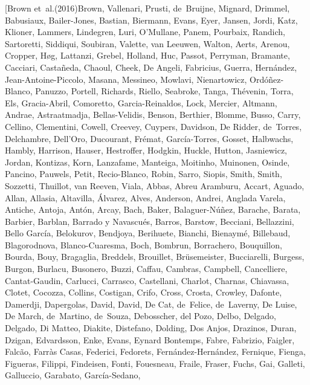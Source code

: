 \documentclass[apj, revtex4-1]{emulateapj}
\begin{document}
\begin{thebibliography}{}
\bibitem[{Brown {et~al.}(2016)Brown, Vallenari, Prusti, de~Bruijne, Mignard,
  Drimmel, Babusiaux, Bailer-Jones, Bastian, Biermann, Evans, Eyer, Jansen,
  Jordi, Katz, Klioner, Lammers, Lindegren, Luri, O'Mullane, Panem, Pourbaix,
  Randich, Sartoretti, Siddiqui, Soubiran, Valette, van Leeuwen, Walton, Aerts,
  Arenou, Cropper, H{\o}g, Lattanzi, Grebel, Holland, Huc, Passot, Perryman,
  Bramante, Cacciari, Casta{\~{n}}eda, Chaoul, Cheek, {De Angeli}, Fabricius,
  Guerra, Hern{\'{a}}ndez, Jean-Antoine-Piccolo, Masana, Messineo, Mowlavi,
  Nienartowicz, Ord{\'{o}}{\~{n}}ez-Blanco, Panuzzo, Portell, Richards, Riello,
  Seabroke, Tanga, Th{\'{e}}venin, Torra, Els, Gracia-Abril, Comoretto,
  Garcia-Reinaldos, Lock, Mercier, Altmann, Andrae, Astraatmadja,
  Bellas-Velidis, Benson, Berthier, Blomme, Busso, Carry, Cellino, Clementini,
  Cowell, Creevey, Cuypers, Davidson, {De Ridder}, de~Torres, Delchambre,
  Dell'Oro, Ducourant, Fr{\'{e}}mat, Garc{\'{i}}a-Torres, Gosset, Halbwachs,
  Hambly, Harrison, Hauser, Hestroffer, Hodgkin, Huckle, Hutton, Jasniewicz,
  Jordan, Kontizas, Korn, Lanzafame, Manteiga, Moitinho, Muinonen, Osinde,
  Pancino, Pauwels, Petit, Recio-Blanco, Robin, Sarro, Siopis, Smith, Smith,
  Sozzetti, Thuillot, van Reeven, Viala, Abbas, {Abreu Aramburu}, Accart,
  Aguado, Allan, Allasia, Altavilla, {\'{A}}lvarez, Alves, Anderson, Andrei,
  {Anglada Varela}, Antiche, Antoja, Ant{\'{o}}n, Arcay, Bach, Baker,
  Balaguer-N{\'{u}}{\~{n}}ez, Barache, Barata, Barbier, Barblan, {Barrado y
  Navascu{\'{e}}s}, Barros, Barstow, Becciani, Bellazzini, {Bello
  Garc{\'{i}}a}, Belokurov, Bendjoya, Berihuete, Bianchi, Bienaym{\'{e}},
  Billebaud, Blagorodnova, Blanco-Cuaresma, Boch, Bombrun, Borrachero,
  Bouquillon, Bourda, Bouy, Bragaglia, Breddels, Brouillet, Br{\"{u}}semeister,
  Bucciarelli, Burgess, Burgon, Burlacu, Busonero, Buzzi, Caffau, Cambras,
  Campbell, Cancelliere, Cantat-Gaudin, Carlucci, Carrasco, Castellani,
  Charlot, Charnas, Chiavassa, Clotet, Cocozza, Collins, Costigan, Crifo,
  Cross, Crosta, Crowley, Dafonte, Damerdji, Dapergolas, David, David, {De
  Cat}, de~Felice, de~Laverny, {De Luise}, {De March}, de~Martino, de~Souza,
  Debosscher, del Pozo, Delbo, Delgado, Delgado, {Di Matteo}, Diakite,
  Distefano, Dolding, {Dos Anjos}, Drazinos, Duran, Dzigan, Edvardsson, Enke,
  Evans, {Eynard Bontemps}, Fabre, Fabrizio, Faigler, Falc{\~{a}}o,
  {Farr{\`{a}}s Casas}, Federici, Fedorets, Fern{\'{a}}ndez-Hern{\'{a}}ndez,
  Fernique, Fienga, Figueras, Filippi, Findeisen, Fonti, Fouesneau, Fraile,
  Fraser, Fuchs, Gai, Galleti, Galluccio, Garabato, Garc{\'{i}}a-Sedano,
}
\end{thebibliography}
\end{document}
